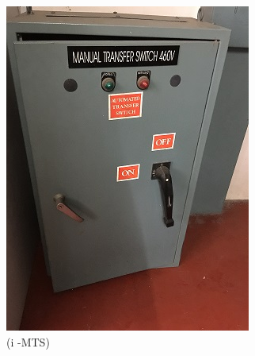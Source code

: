 \begin{figure}
\begin{minipage}[b]{0.22\linewidth}
	\includegraphics[width=\textwidth]{figures/asv_visual_mts}
	\caption*{(i -MTS)}
\end{minipage}
	\hspace{0.03cm}
\begin{minipage}[b]{0.22\linewidth}

\end{minipage}
\end{figure}
